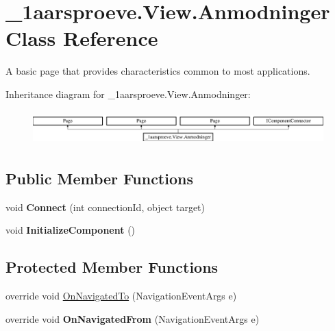\hypertarget{class__1aarsproeve_1_1_view_1_1_anmodninger}{}\section{\+\_\+1aarsproeve.\+View.\+Anmodninger Class Reference}
\label{class__1aarsproeve_1_1_view_1_1_anmodninger}


A basic page that provides characteristics common to most applications.  


Inheritance diagram for \+\_\+1aarsproeve.\+View.\+Anmodninger\+:\begin{figure}[H]
\begin{center}
\leavevmode
\includegraphics[height=1.333333cm]{class__1aarsproeve_1_1_view_1_1_anmodninger}
\end{center}
\end{figure}
\subsection*{Public Member Functions}
\begin{DoxyCompactItemize}
\item 
\hypertarget{class__1aarsproeve_1_1_view_1_1_anmodninger_ad9bbeab5b4e1914714187606eefd0637}{}void {\bfseries Connect} (int connection\+Id, object target)\label{class__1aarsproeve_1_1_view_1_1_anmodninger_ad9bbeab5b4e1914714187606eefd0637}

\item 
\hypertarget{class__1aarsproeve_1_1_view_1_1_anmodninger_a42c78dbfe7217528e7d4aee43189c2f5}{}void {\bfseries Initialize\+Component} ()\label{class__1aarsproeve_1_1_view_1_1_anmodninger_a42c78dbfe7217528e7d4aee43189c2f5}

\end{DoxyCompactItemize}
\subsection*{Protected Member Functions}
\begin{DoxyCompactItemize}
\item 
override void \hyperlink{class__1aarsproeve_1_1_view_1_1_anmodninger_a875b08d89ff50513d23463d606d0547e}{On\+Navigated\+To} (Navigation\+Event\+Args e)
\item 
\hypertarget{class__1aarsproeve_1_1_view_1_1_anmodninger_a4815440fb5588b8a20afca15427353e9}{}override void {\bfseries On\+Navigated\+From} (Navigation\+Event\+Args e)\label{class__1aarsproeve_1_1_view_1_1_anmodninger_a4815440fb5588b8a20afca15427353e9}

\end{DoxyCompactItemize}
